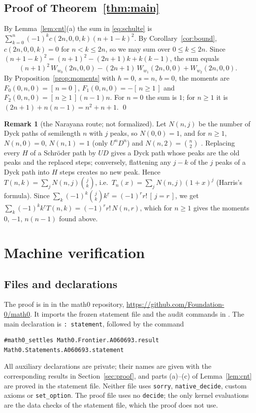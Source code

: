 \documentclass[11pt]{amsart}
\theoremstyle{plain}
\theoremstyle{definition}
\newtheorem{remark}[theorem]{Remark}
\newcommand{\ib}[1]{[\,#1\,]}
\begin{document}
\subsection{Proof of Theorem~\ref{thm:main}}
By Lemma~\ref{lem:cnt}(a) the sum in \eqref{eq:schulte} is $\sum_{k=0}^n(-1)^kc(2n,0,0,k)(n+1-k)^2$. By Corollary~\ref{cor:bound}, $c(2n,0,0,k)=0$ for $n<k\le2n$, so we may sum over $0\le k\le 2n$. Since $(n+1-k)^2=(n+1)^2-(2n+1)k+k(k-1)$, the sum equals
\[
  (n+1)^2\,W_{w_0}(2n,0,0)-(2n+1)\,W_{w_1}(2n,0,0)+W_{w_2}(2n,0,0).
\]
By Proposition~\ref{prop:moments} with $h=0$, $s=n$, $b=0$, the moments are $F_0(0,n,0)=\ib{n=0}$, $F_1(0,n,0)=-\ib{n\ge1}$ and $F_2(0,n,0)=\ib{n\ge1}(n-1)n$. For $n=0$ the sum is $1$; for $n\ge1$ it is $(2n+1)+n(n-1)=n^2+n+1$. \qed

\begin{remark}[the Narayana route; not formalized]\label{rem:narayana}
Let $N(n,j)$ be the number of Dyck paths of semilength $n$ with $j$ peaks, so $N(0,0)=1$, and for $n\ge1$, $N(n,0)=0$, $N(n,1)=1$ (only $U^nD^n$) and $N(n,2)=\binom n2$ \cite{A001263,A090181}. Replacing every $H$ of a Schr\"oder path by $UD$ gives a Dyck path whose peaks are the old peaks and the replaced steps; conversely, flattening any $j-k$ of the $j$ peaks of a Dyck path into $H$ steps creates no new peak. Hence $T(n,k)=\sum_jN(n,j)\binom jk$, i.e.\ $T_n(x)=\sum_jN(n,j)(1+x)^j$ (Harris's formula). Since $\sum_k(-1)^k\binom jk k^{\underline r}=(-1)^r r!\,\ib{j=r}$, we get $\sum_k(-1)^kk^{\underline r}T(n,k)=(-1)^rr!\,N(n,r)$, which for $n\ge1$ gives the moments $0$, $-1$, $n(n-1)$ found above.
\end{remark}

\section{Machine verification}\label{sec:lean}

\subsection*{Files and declarations}
The proof is in  in the math0 repository, \url{https://github.com/Foundation-0/math0}. It imports the frozen statement file  and the audit commands in . The main declaration is  \texttt{: statement}, followed by the command
\begin{lstlisting}
#math0_settles Math0.Frontier.A060693.result Math0.Statements.A060693.statement
\end{lstlisting}
All auxiliary declarations are private; their names are given with the corresponding results in Section~\ref{sec:proof}, and parts (a)--(c) of Lemma~\ref{lem:cnt} are proved in the statement file. Neither file uses \texttt{sorry}, \texttt{native\_decide}, custom axioms or \texttt{set\_option}. The proof file uses no \texttt{decide}; the only kernel evaluations are the data checks of the statement file, which the proof does not use.
\end{document}
